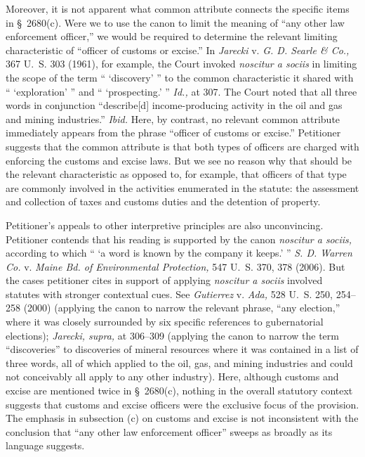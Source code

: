   Moreover, it is not apparent what common attribute connects the specific items in \S~2680(c). Were we to use the canon to limit the meaning of ``any other law enforcement officer,'' we would be required to determine the relevant limiting characteristic of ``officer of customs or excise.'' In \emph{Jarecki} v. \emph{G. D. Searle \& Co.,} 367 U.~S. 303 (1961), for example, the Court invoked \emph{noscitur a sociis} in limiting the scope of the term `` ‘discovery' '' to the common characteristic it shared with `` ‘exploration' '' and `` ‘prospecting.' '' \emph{Id.,} at 307. The Court noted that all three words in conjunction ``describe[d] income-producing activity in the oil and gas and mining industries.'' \emph{Ibid.} Here, by contrast, no relevant common attribute immediately appears from the phrase ``officer of customs or excise.'' Petitioner suggests that the common attribute is that both types of officers are charged with enforcing the customs and excise laws. But we see no reason why that should be the relevant characteristic as opposed to, for example, that officers of that type are commonly involved in the activities enumerated in the statute: the as\starpage sessment and collection of taxes and customs duties and the detention of property.

  Petitioner's appeals to other interpretive principles are also unconvincing. Petitioner contends that his reading is supported by the canon \emph{noscitur a sociis,} according to which `` ‘a word is known by the company it keeps.' '' \emph{S. D. Warren Co.} v. \emph{Maine Bd. of Environmental Protection,} 547 U.~S. 370, 378 (2006). But the cases petitioner cites in support of applying \emph{noscitur a sociis} involved statutes with stronger contextual cues. See \emph{Gutierrez} v. \emph{Ada,} 528 U.~S. 250, 254--258 (2000) (applying the canon to narrow the relevant phrase, ``any election,'' where it was closely surrounded by six specific references to gubernatorial elections); \emph{Jarecki, supra,} at 306--309 (applying the canon to narrow the term ``discoveries'' to discoveries of mineral resources where it was contained in a list of three words, all of which applied to the oil, gas, and mining industries and could not conceivably all apply to any other industry). Here, although customs and excise are mentioned twice in \S~2680(c), nothing in the overall statutory context suggests that customs and excise officers were the exclusive focus of the provision. The emphasis in subsection (c) on customs and excise is not inconsistent with the conclusion that ``any other law enforcement officer'' sweeps as broadly as its language suggests.

